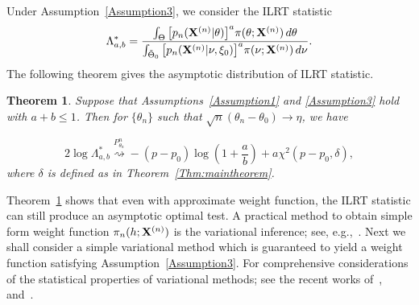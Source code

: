 \documentclass[11pt]{article}
\theoremstyle{plain}
\newtheorem{theorem}{\quad\quad Theorem}
\theoremstyle{definition}
\theoremstyle{remark}
\begin{document}
Under Assumption~\ref{Assumption3}, we consider the ILRT statistic
\begin{equation}
    \Lambda^*_{a,b}=\frac{\int_{\Theta} \big[p_n(\mathbf{X}^{(n)}|\theta)\big]^{a}\pi(\theta;\mathbf{X}^{(n)})\,d\theta}{\int_{\tilde{\Theta}_0} \big[p_n(\mathbf{X}^{(n)}|\nu,\xi_0)\big]^{a}\pi(\nu;\mathbf{X}^{(n)})\,d\nu}.
\label{eq:definition}
\end{equation}
The following theorem gives the asymptotic distribution of ILRT statistic.


\begin{theorem}\label{theoremMain}
    Suppose that Assumptions~\ref{Assumption1} and \ref{Assumption3} hold with $a+b\leq 1$.
    Then for $\{\theta_n\}$ such that $\sqrt{n}(\theta_n-\theta_0)\to \eta$, we have

        $$
        2\log \Lambda^*_{a,b}\overset{P^n_{\theta_n}}{\rightsquigarrow}-{(p-p_0)}\log (1+\frac{a}{b})+{a}\chi^2(p-p_0,\delta),
        $$
        where $\delta$ is defined as in Theorem~\ref{Thm:maintheorem}.
\end{theorem}
Theorem~\ref{theoremMain} shows that even with approximate weight function, the ILRT statistic can still produce an asymptotic optimal test.
A practical method to obtain simple form weight function $\pi_n(h;\mathbf{X}^{(n)})$ is the variational inference; see, e.g.,~\cite{blei2017}.
Next we shall consider a simple variational method which is guaranteed to yield a weight function satisfying Assumption~\ref{Assumption3}.
For comprehensive considerations of the statistical properties of variational methods; see the recent works of~\cite{yixin2017},~\cite{pati2017} and~\cite{yunyang2017}.

\end{document}
